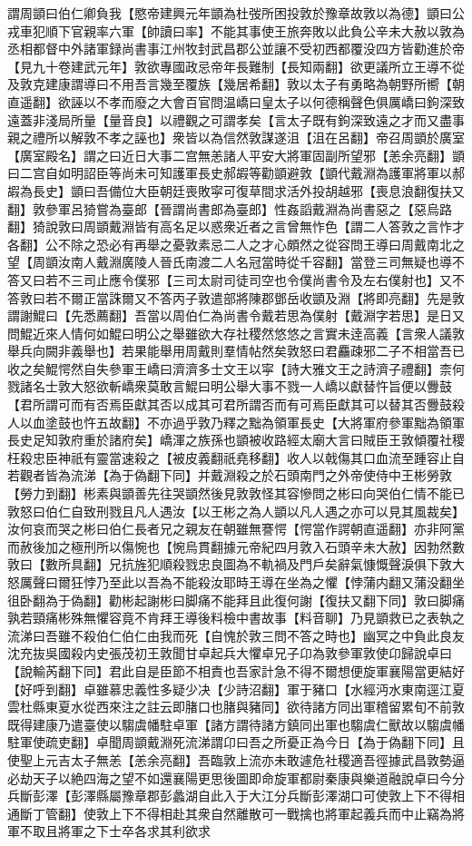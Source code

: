 謂周顗曰伯仁卿負我【愍帝建興元年顗為杜弢所困投敦於豫章故敦以為德】顗曰公戎車犯順下官親率六軍【帥讀曰率】不能其事使王旅奔敗以此負公辛未大赦以敦為丞相都督中外諸軍録尚書事江州牧封武昌郡公並讓不受初西都覆没四方皆勸進於帝【見九十卷建武元年】敦欲專國政忌帝年長難制【長知兩翻】欲更議所立王導不從及敦克建康謂導曰不用吾言幾至覆族【幾居希翻】敦以太子有勇略為朝野所嚮【朝直遥翻】欲誣以不孝而廢之大會百官問温嶠曰皇太子以何德稱聲色俱厲嶠曰鉤深致遠蓋非淺局所量【量音良】以禮觀之可謂孝矣【言太子既有鉤深致遠之才而又盡事親之禮所以解敦不孝之誣也】衆皆以為信然敦謀遂沮【沮在呂翻】帝召周顗於廣室【廣室殿名】謂之曰近日大事二宫無恙諸人平安大將軍固副所望邪【恙余亮翻】顗曰二宫自如明詔臣等尚未可知護軍長史郝嘏等勸顗避敦【顗代戴淵為護軍將軍以郝嘏為長史】顗曰吾備位大臣朝廷喪敗寜可復草間求活外投胡越邪【喪息浪翻復扶又翻】敦參軍呂猗嘗為臺郎【晉謂尚書郎為臺郎】性姦謟戴淵為尚書惡之【惡烏路翻】猗說敦曰周顗戴淵皆有高名足以惑衆近者之言曾無怍色【謂二人答敦之言怍才各翻】公不除之恐必有再舉之憂敦素忌二人之才心頗然之從容問王導曰周戴南北之望【周顗汝南人戴淵廣陵人晉氏南渡二人名冠當時從千容翻】當登三司無疑也導不答又曰若不三司止應令僕邪【三司太尉司徒司空也令僕尚書令及左右僕射也】又不答敦曰若不爾正當誅爾又不答丙子敦遣部將陳郡鄧岳收顗及淵【將即亮翻】先是敦謂謝鯤曰【先悉薦翻】吾當以周伯仁為尚書令戴若思為僕射【戴淵字若思】是日又問鯤近來人情何如鯤曰明公之舉雖欲大存社稷然悠悠之言實未逹高義【言衆人議敦舉兵向闕非義舉也】若果能舉用周戴則羣情帖然矣敦怒曰君麤疎邪二子不相當吾已收之矣鯤愕然自失參軍王嶠曰濟濟多士文王以寜【詩大雅文王之詩濟子禮翻】柰何戮諸名士敦大怒欲斬嶠衆莫敢言鯤曰明公舉大事不戮一人嶠以獻替忤旨便以釁鼓【君所謂可而有否焉臣獻其否以成其可君所謂否而有可焉臣獻其可以替其否釁鼓殺人以血塗鼓也忤五故翻】不亦過乎敦乃釋之黜為領軍長史【大將軍府參軍黜為領軍長史足知敦府重於諸府矣】嶠渾之族孫也顗被收路經太廟大言曰賊臣王敦傾覆社稷枉殺忠臣神祇有靈當速殺之【被皮義翻祇堯移翻】收人以戟傷其口血流至踵容止自若觀者皆為流涕【為于偽翻下同】并戴淵殺之於石頭南門之外帝使侍中王彬勞敦【勞力到翻】彬素與顗善先往哭顗然後見敦敦怪其容慘問之彬曰向哭伯仁情不能已敦怒曰伯仁自致刑戮且凡人遇汝【以王彬之為人顗以凡人遇之亦可以見其風裁矣】汝何哀而哭之彬曰伯仁長者兄之親友在朝雖無謇愕【愕當作諤朝直遥翻】亦非阿黨而赦後加之極刑所以傷惋也【惋烏貫翻據元帝紀四月敦入石頭辛未大赦】因勃然數敦曰【數所具翻】兄抗旌犯順殺戮忠良圖為不軌禍及門戶矣辭氣慷慨聲淚俱下敦大怒厲聲曰爾狂悖乃至此以吾為不能殺汝耶時王導在坐為之懼【悖蒲内翻又蒲没翻坐徂卧翻為于偽翻】勸彬起謝彬曰脚痛不能拜且此復何謝【復扶又翻下同】敦曰脚痛孰若頸痛彬殊無懼容竟不肯拜王導後料檢中書故事【料音聊】乃見顗救已之表執之流涕曰吾雖不殺伯仁伯仁由我而死【自愧於敦三問不答之時也】幽冥之中負此良友沈充抜吳國殺内史張茂初王敦聞甘卓起兵大懼卓兄子卬為敦參軍敦使卬歸說卓曰【說輸芮翻下同】君此自是臣節不相責也吾家計急不得不爾想便旋軍襄陽當更結好【好呼到翻】卓雖慕忠義性多疑少决【少詩沼翻】軍于豬口【水經沔水東南逕江夏雲杜縣東夏水從西來注之註云即䐗口也䐗與豬同】欲待諸方同出軍稽留累旬不前敦既得建康乃遣臺使以騶虞幡駐卓軍【諸方謂待諸方鎮同出軍也騶虞仁獸故以騶虞幡駐軍使疏吏翻】卓聞周顗戴淵死流涕謂卬曰吾之所憂正為今日【為于偽翻下同】且使聖上元吉太子無恙【恙余亮翻】吾臨敦上流亦未敢遽危社稷適吾徑據武昌敦勢逼必劫天子以絶四海之望不如還襄陽更思後圖即命旋軍都尉秦康與樂道融說卓曰今分兵斷彭澤【彭澤縣屬豫章郡彭蠡湖自此入于大江分兵斷彭澤湖口可使敦上下不得相通斷丁管翻】使敦上下不得相赴其衆自然離散可一戰擒也將軍起義兵而中止竊為將軍不取且將軍之下士卒各求其利欲求